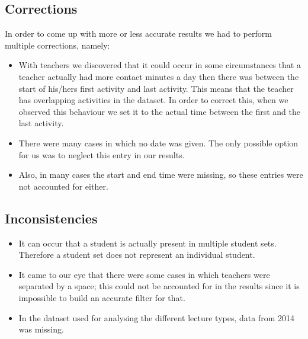 \subsection{Corrections}
In order to come up with more or less accurate results we had to perform multiple corrections, namely:
\begin{itemize}
	\item With teachers we discovered that it could occur in some circumstances that a teacher actually had more contact minutes a day then there was between the start of his/hers first activity and last activity. This means that the teacher has overlapping activities in the dataset. In order to correct this, when we observed this behaviour we set it to the actual time between the first and the last activity.
	\item There were many cases in which no date was given. The only possible option for us was to neglect this entry in our results.
	\item Also, in many cases the start and end time were missing, so these entries were not accounted for either.
\end{itemize}

\subsection{Inconsistencies}
\begin{itemize}
	\item It can occur that a student is actually present in multiple student sets. Therefore a student set does not represent an individual student.
	\item It came to our eye that there were some cases in which teachers were separated by a space; this could not be accounted for in the results since it is impossible to build an accurate filter for that.
	\item In the dataset used for analysing the different lecture types, data from 2014 was missing.
\end{itemize}